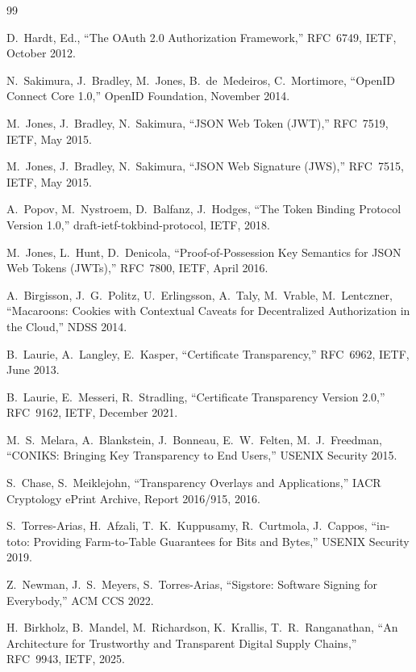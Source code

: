 \documentclass[11pt,a4paper]{article}
\begin{document}
\begin{thebibliography}{99}

 D.~Hardt, Ed., ``The OAuth 2.0 Authorization Framework,'' RFC~6749, IETF, October 2012.

 N.~Sakimura, J.~Bradley, M.~Jones, B.~de~Medeiros, C.~Mortimore, ``OpenID Connect Core 1.0,'' OpenID Foundation, November 2014.

 M.~Jones, J.~Bradley, N.~Sakimura, ``JSON Web Token (JWT),'' RFC~7519, IETF, May 2015.

 M.~Jones, J.~Bradley, N.~Sakimura, ``JSON Web Signature (JWS),'' RFC~7515, IETF, May 2015.

 A.~Popov, M.~Nystroem, D.~Balfanz, J.~Hodges, ``The Token Binding Protocol Version 1.0,'' draft-ietf-tokbind-protocol, IETF, 2018.

 M.~Jones, L.~Hunt, D.~Denicola, ``Proof-of-Possession Key Semantics for JSON Web Tokens (JWTs),'' RFC~7800, IETF, April 2016.

 A.~Birgisson, J.~G.~Politz, U.~Erlingsson, A.~Taly, M.~Vrable, M.~Lentczner, ``Macaroons: Cookies with Contextual Caveats for Decentralized Authorization in the Cloud,'' NDSS 2014.

 B.~Laurie, A.~Langley, E.~Kasper, ``Certificate Transparency,'' RFC~6962, IETF, June 2013.

 B.~Laurie, E.~Messeri, R.~Stradling, ``Certificate Transparency Version 2.0,'' RFC~9162, IETF, December 2021.

 M.~S.~Melara, A.~Blankstein, J.~Bonneau, E.~W.~Felten, M.~J.~Freedman, ``CONIKS: Bringing Key Transparency to End Users,'' USENIX Security 2015.

 S.~Chase, S.~Meiklejohn, ``Transparency Overlays and Applications,'' IACR Cryptology ePrint Archive, Report 2016/915, 2016.

 S.~Torres-Arias, H.~Afzali, T.~K.~Kuppusamy, R.~Curtmola, J.~Cappos, ``in-toto: Providing Farm-to-Table Guarantees for Bits and Bytes,'' USENIX Security 2019.

 Z.~Newman, J.~S.~Meyers, S.~Torres-Arias, ``Sigstore: Software Signing for Everybody,'' ACM CCS 2022.

 H.~Birkholz, B.~Mandel, M.~Richardson, K.~Krallis, T.~R.~Ranganathan, ``An Architecture for Trustworthy and Transparent Digital Supply Chains,'' RFC~9943, IETF, 2025.


\end{thebibliography}
\end{document}
